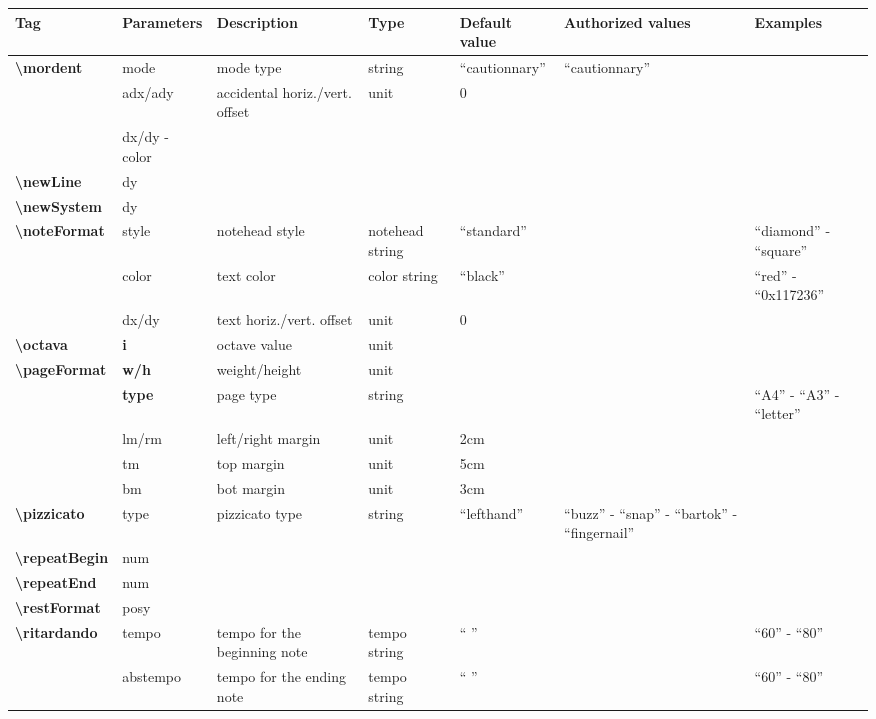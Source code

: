 \documentclass[a4paper, landscape, 10pt]{article}
\begin{document}
\begin{tabularx}{\linewidth}{p{3cm}p{2cm}p{5cm}p{3cm}p{3.5cm}p{3.5cm}p{4cm}}
    \hline
    \textbf{Tag}&\textbf{Parameters}&\textbf{Description}&\textbf{Type}&\textbf{Default value}&\textbf{Authorized values}&\textbf{Examples}\\
    \hline
    \textbf{\textbackslash{}mordent}&mode&mode type&string&``cautionnary''&``cautionnary''&\\
    &adx/ady&accidental horiz./vert. offset&unit&0&&\\
    &dx/dy - color&&&&&\\
    \hline
    \textbf{\textbackslash{}newLine}&dy&&&&&\\ %
    \hline
    \textbf{\textbackslash{}newSystem}&dy&&&&&\\ %
    \hline
    \textbf{\textbackslash{}noteFormat}&style&notehead style&notehead string&``standard''&&``diamond'' - ``square''\\
	&color&text color&color string&``black''&&``red'' - ``0x117236''\\
    &dx/dy&text horiz./vert. offset&unit&0&&\\
    \hline
    \textbf{\textbackslash{}octava}&\textbf{i}&octave value&unit&&&\\
    \hline
    \textbf{\textbackslash{}pageFormat}&\textbf{w/h}&weight/height&unit&&&\\
    &\textbf{type}&page type&string&&&``A4'' - ``A3'' - ``letter''\\
    &lm/rm&left/right margin&unit&2cm&&\\
    &tm&top margin&unit&5cm&&\\
    &bm&bot margin&unit&3cm&&\\
    \hline
    \textbf{\textbackslash{}pizzicato}&type&pizzicato type&string&``lefthand''&``buzz'' - ``snap'' - ``bartok'' - ``fingernail''&\\
    \hline
    \textbf{\textbackslash{}repeatBegin}&num&&&&&\\ %
    \hline
    \textbf{\textbackslash{}repeatEnd}&num&&&&&\\ %
    \hline
    \textbf{\textbackslash{}restFormat}&posy&&&&&\\ %
    \hline
    \textbf{\textbackslash{}ritardando}&tempo&tempo for the beginning note&tempo string&`` ''&&``60'' - ``80''\\
    &abstempo&tempo for the ending note&tempo string&`` ''&&``60'' - ``80''\\

\end{tabularx}
\end{document}
